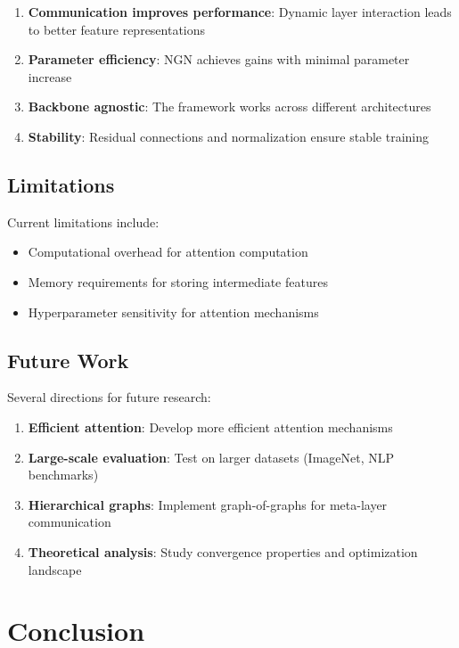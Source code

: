 \documentclass[11pt]{article}
\begin{document}
\begin{enumerate}
    \item \textbf{Communication improves performance}: Dynamic layer interaction leads to better feature representations
    \item \textbf{Parameter efficiency}: NGN achieves gains with minimal parameter increase
    \item \textbf{Backbone agnostic}: The framework works across different architectures
    \item \textbf{Stability}: Residual connections and normalization ensure stable training
\end{enumerate}

\subsection{Limitations}

Current limitations include:
\begin{itemize}
    \item Computational overhead for attention computation
    \item Memory requirements for storing intermediate features
    \item Hyperparameter sensitivity for attention mechanisms
\end{itemize}

\subsection{Future Work}

Several directions for future research:

\begin{enumerate}
    \item \textbf{Efficient attention}: Develop more efficient attention mechanisms
    \item \textbf{Large-scale evaluation}: Test on larger datasets (ImageNet, NLP benchmarks)
    \item \textbf{Hierarchical graphs}: Implement graph-of-graphs for meta-layer communication
    \item \textbf{Theoretical analysis}: Study convergence properties and optimization landscape
\end{enumerate}

\section{Conclusion}
\end{document}
